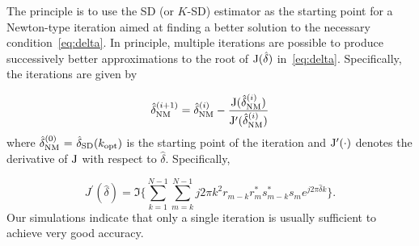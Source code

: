 The principle is to use the SD (or $K$-SD) estimator as the starting point for a Newton-type iteration 
aimed at finding a better solution to the necessary condition~\eqref{eq:delta}. 
In principle, multiple iterations are possible to produce successively better approximations to the root of
$\mathrm{J}(\hat{\delta})$ in~\eqref{eq:delta}. Specifically, the iterations are given by

\begin{equation}
    \label{eq:iter_NM_est}
    \hat{\delta}_{\text{NM}}^{(i+1)}=\hat{\delta}_{\text{NM}}^{(i)}-
    \frac{\mathrm{J}(\hat{\delta}_{\text{NM}}^{(i)})}{\mathrm{J}^\prime(\hat{\delta}_{\text{NM}}^{(i)})}
  \end{equation}
where $\hat{\delta}_{\text{NM}}^{(0)}~{=}~\hat{\delta}_{\text{SD}}(k_{\text{opt}})$ is the starting point of the iteration and
$\mathrm{J}^\prime(\cdot)$ denotes the derivative of $\mathrm{J}$ with respect to $\hat{\delta}$. Specifically,

\begin{equation}
    \label{eq:derivative of delta}
    J^\prime(\hat{\delta}) = \Im\bigg\{\sum_{k=1}^{N-1}{\sum_{m=k}^{N-1}{j2\pi k^2r_{m-k}r_m^{*}s_{m-k}^{*}s_m}e^{j2\pi\hat{\delta}k}}\bigg\}.
    \end{equation}
Our simulations indicate that only a single iteration is usually sufficient to achieve very good accuracy.

% 
% 
